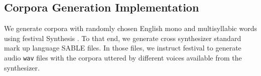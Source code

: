 \documentclass[11pt,a4paper]{article}
\begin{document}
\subsection{Corpora Generation Implementation}
\label{CorpGenImp}





We generate corpora with randomly chosen English mono and multisyllabic words using \gls{festival} Synthesis \cite{festival2014}. To that end, we generate cross synthesizer standard mark up language SABLE \cite{sable} files. In those files, we instruct \gls{festival} to generate audio \texttt{wav} files with the corpora uttered by different voices available from the synthesizer.
\end{document}
